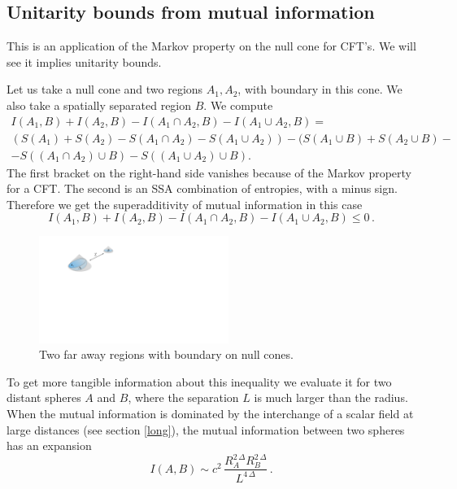 \documentclass[12pt]{article}
\numberwithin{equation}{section}
\newcommand{\be}{\begin{equation}}
\newcommand{\ee}{\end{equation}}
\begin{document}
\subsection{Unitarity bounds from mutual information}
This is an application of the Markov property on the null cone for CFT's. We will see it implies unitarity bounds.  

Let us take a null cone and two regions $A_1, A_2$, with boundary in this cone. We also take a spatially separated region $B$. We compute
\begin{multline}
\!\!\!I(A_1,B)+I(A_2,B)-I(A_1\cap A_2,B)-I(A_1\cup A_2,B) = \\
(S(A_1)+S(A_2)-S(A_1\cap A_2)-S(A_1\cup A_2))
- (S(A_1\cup B)+S(A_2\cup B)- 
\\ - S((A_1\cap A_2)\cup B)-S((A_1\cup A_2)\cup B). 
\end{multline}
The first bracket on the right-hand side vanishes because of the Markov property for a CFT. The second is an SSA combination of entropies, with a minus sign. Therefore we get the superadditivity of mutual information in this case
\be
I(A_1,B)+I(A_2,B)-I(A_1\cap A_2,B)-I(A_1\cup A_2,B)\le 0\,.
\ee

\begin{figure}[t]
\begin{center}
\includegraphics[width=0.55\textwidth]{unitarity.pdf} 
\caption{Two far away regions with boundary on null cones.}
\label{unitarity}
\end{center}
\end{figure}


To get more tangible information about this inequality we evaluate it for two distant spheres $A$ and $B$, where the separation $L$ is much larger than the radius. When the mutual information is dominated by the interchange of a scalar field at large distances (see section \ref{long}), the mutual information between two spheres has an expansion
\be
I(A,B)\sim c^2\,\frac{R_A^{2\, \Delta} R_B^{2\, \Delta}}{L^{4 \,\Delta}}\,. \label{hjhj}
\ee
\end{document}
